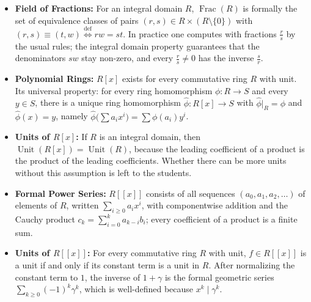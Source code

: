 \begin{overview}
\begin{itemize}
    \item \textbf{Field of Fractions:} For an integral domain $R$, $\operatorname{Frac}(R)$ is formally the set of equivalence classes of pairs $(r, s) \in R \times (R \setminus \{0\})$ with $(r, s) \equiv (t, w) \stackrel{\text{def}}{\iff} rw = st$. In practice one computes with fractions $\frac{r}{s}$ by the usual rules; the integral domain property guarantees that the denominators $sw$ stay non-zero, and every $\frac{r}{s} \neq 0$ has the inverse $\frac{s}{r}$.
    \item \textbf{Polynomial Rings:} $R[x]$ exists for every commutative ring $R$ with unit. Its universal property: for every ring homomorphism $\phi \colon R \to S$ and every $y \in S$, there is a unique ring homomorphism $\hat{\phi} \colon R[x] \to S$ with $\hat{\phi}|_R = \phi$ and $\hat{\phi}(x) = y$, namely $\hat{\phi}\bigl(\sum a_i x^i\bigr) = \sum \phi(a_i) y^i$.
    \item \textbf{Units of $R[x]$:} If $R$ is an integral domain, then $\operatorname{Unit}(R[x]) = \operatorname{Unit}(R)$, because the leading coefficient of a product is the product of the leading coefficients. Whether there can be more units without this assumption is left to the students.
    \item \textbf{Formal Power Series:} $R[[x]]$ consists of all sequences $(a_0, a_1, a_2, \dots)$ of elements of $R$, written $\sum_{i \ge 0} a_i x^i$, with componentwise addition and the Cauchy product $c_k = \sum_{i=0}^k a_{k-i} b_i$; every coefficient of a product is a finite sum.
    \item \textbf{Units of $R[[x]]$:} For every commutative ring $R$ with unit, $f \in R[[x]]$ is a unit if and only if its constant term is a unit in $R$. After normalizing the constant term to $1$, the inverse of $1 + \gamma$ is the formal geometric series $\sum_{k \ge 0} (-1)^k \gamma^k$, which is well-defined because $x^k \mid \gamma^k$.
\end{itemize}
\end{overview}

